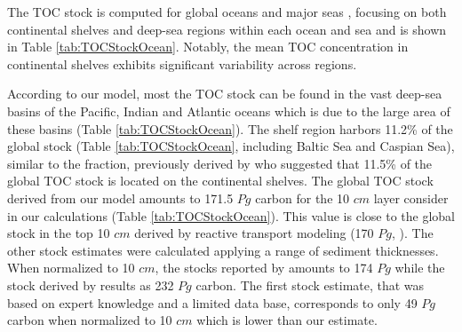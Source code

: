 \documentclass[journal abbreviation, manuscript]{copernicus}
\begin{document}
The TOC stock is computed for global oceans and major seas \citep{FlandersMarineInstitute2021}, focusing on both continental shelves and deep-sea regions within each ocean and sea and is shown in Table \ref{tab:TOCStockOcean}. Notably, the mean TOC concentration in continental shelves exhibits significant variability across regions. 

According to our  model, most the TOC stock can be found in the vast deep-sea basins of the Pacific, Indian and Atlantic oceans which is due to the large area of these basins (Table \ref{tab:TOCStockOcean}). The shelf region harbors 11.2\% of the global stock (Table \ref{tab:TOCStockOcean}, including Baltic Sea and Caspian Sea), similar to the fraction, previously derived by \cite{atwood2020} who suggested that 11.5\% of the global TOC stock is located on the continental shelves. The global TOC stock derived from our model amounts to 171.5 $Pg$ carbon for the 10 $cm$ layer consider in our calculations (Table \ref{tab:TOCStockOcean}). This value is close to the global stock in the top 10 $cm$ derived by reactive transport modeling (170 $Pg$, \cite{larowe2020b}). The other stock estimates were calculated applying a range of sediment thicknesses. When normalized to 10 $cm$, the stocks reported by \cite{LeeTOCkNN} amounts to 174 $Pg$ while the stock derived by \cite{atwood2020} results as 232 $Pg$ carbon. The first stock estimate, that was based on expert knowledge and a limited data base, corresponds to only 49 $Pg$ carbon when normalized to 10 $cm$ \citep{Emerson1988} which is lower than our estimate.
\end{document}
